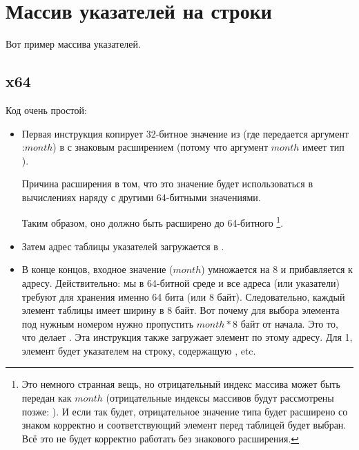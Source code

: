 ﻿\section{Массив указателей на строки}
\label{array_of_pointers_to_strings}

Вот пример массива указателей.



\subsection{x64}



Код очень простой:

\begin{itemize}

\item
{}
Первая инструкция  копирует 32-битное значение из \ECX (где передается аргумент :$month$)
в \RAX с знаковым расширением (потому что аргумент $month$ имеет тип \Tint).

Причина расширения в том, что это значение будет использоваться в вычислениях наряду с другими 64-битными
значениями.

Таким образом, оно должно быть расширено до 64-битного
\footnote{Это немного странная вещь, но отрицательный индекс массива может быть передан как $month$ 
(отрицательные индексы массивов будут рассмотрены позже: ).
И если так будет, отрицательное значение типа \Tint будет расширено со знаком корректно
и соответствующий элемент перед таблицей будет выбран.
Всё это не будет корректно работать без знакового расширения.}.

\item
Затем адрес таблицы указателей загружается в \RCX.

\item
В конце концов, входное значение ($month$) умножается на 8 и прибавляется к адресу.
Действительно: мы в 64-битной среде и все адреса (или указатели) 
требуют для хранения именно 64 бита (или 8 байт).
Следовательно, каждый элемент таблицы имеет ширину в 8 байт.
Вот почему для выбора элемента под нужным номером нужно пропустить $month*8$ байт от начала.
Это то, что делает \MOV.
Эта инструкция также загружает элемент по этому адресу.
Для 1, элемент будет указателем на строку, содержащую , etc.

\end{itemize}

